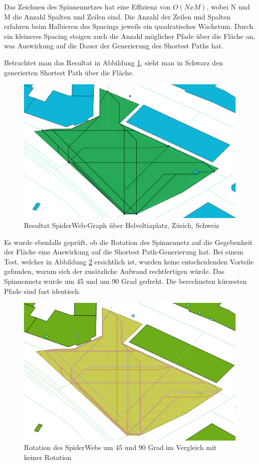 Das Zeichnen des Spinnennetzes hat eine Effizienz von \(O(NxM)\), wobei N und M die Anzahl Spalten und Zeilen sind. Die Anzahl der Zeilen und Spalten erfahren beim Halbieren des Spacings jeweils ein quadratisches Wachstum. Durch ein kleineres Spacing steigen auch die Anzahl möglicher Pfade über die Fläche an, was Auswirkung auf die Dauer der Generierung des Shortest Paths hat. 

Betrachtet man das Resultat in Abbildung \ref{fig:spiderweb_result}, sieht man in Schwarz den generierten Shortest Path über die Fläche.

\begin{figure}[th]
\centering
\includegraphics[width=0.7\linewidth]{technicalreport/img/spiderweb_result}
\caption[Resultat SpiderWeb-Graph]{Resultat SpiderWeb-Graph über Helveltiaplatz, Zürich, Schweiz}
\label{fig:spiderweb_result}
\end{figure}


Es wurde ebenfalls geprüft, ob die Rotation des Spinnennetz auf die Gegebenheit der Fläche eine Auswirkung auf die Shortest Path-Generierung hat. Bei einem Test, welcher in Abbildung \ref{fig:rotation_comparison} ersichtlich ist, wurden keine entscheidenden Vorteile gefunden, warum sich der zusätzliche Aufwand rechtfertigen würde. Das Spinnennetz wurde um 45 und um 90 Grad gedreht. Die berechneten kürzesten Pfade sind fast identisch.

\begin{figure}[th]
\centering
\includegraphics[width=0.7\linewidth]{technicalreport/img/rotation_comparison}
\caption[SpiderWeb-Graph Vergleich mit Rotation]{Rotation des SpiderWebs um 45 und 90 Grad im Vergleich mit keiner Rotation}
\label{fig:rotation_comparison}
\end{figure}

